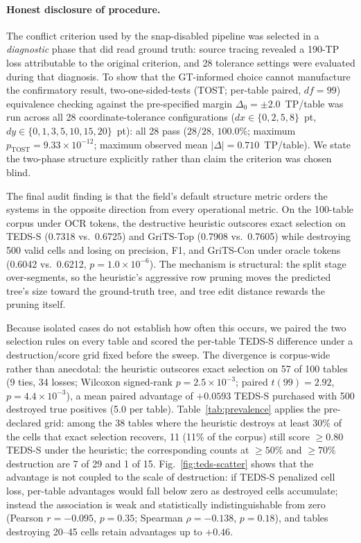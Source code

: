 \documentclass[final,5p,times,twocolumn]{elsarticle}
\begin{document}
\paragraph{Honest disclosure of procedure.} The conflict criterion used by the
snap-disabled pipeline was selected in a \emph{diagnostic} phase that did read
ground truth: source tracing revealed a 190-TP loss attributable to the
original criterion, and 28 tolerance settings were evaluated during that
diagnosis. To show that the GT-informed choice cannot manufacture the
confirmatory result, two-one-sided-tests (TOST; per-table paired, $df{=}99$)
equivalence checking against
the pre-specified margin $\Delta_0 = \pm 2.0$~TP/table was run across all 28
coordinate-tolerance configurations ($dx \in \{0, 2, 5, 8\}$~pt, $dy \in
\{0, 1, 3, 5, 10, 15, 20\}$~pt): all 28 pass ($28/28$, $100.0\%$; maximum
$p_{\mathrm{TOST}} = 9.33 \times 10^{-12}$; maximum observed mean
$|\Delta| = 0.710$~TP/table). We state the two-phase structure explicitly
rather than claim the criterion was chosen blind.

The final audit finding is that the field's default structure metric orders
the systems in the opposite direction from every operational metric. On the
100-table corpus under OCR tokens, the destructive heuristic outscores exact
selection on TEDS-S (0.7318 vs.\ 0.6725) and GriTS-Top (0.7908 vs.\ 0.7605)
while destroying 500 valid cells and losing on precision, F1, and
GriTS-Con under oracle tokens (0.6042 vs.\ 0.6212, $p=1.0\times 10^{-6}$).
The mechanism is structural: the split stage over-segments, so the heuristic's
aggressive row pruning moves the predicted tree's size toward the
ground-truth tree, and tree edit distance rewards the pruning itself.

Because isolated cases do not establish how often this occurs, we paired the
two selection rules on every table and scored the per-table TEDS-S
difference under a destruction/score grid fixed before the sweep. The divergence is
corpus-wide rather than anecdotal: the heuristic outscores exact selection
on 57 of 100 tables (9 ties, 34 losses; Wilcoxon signed-rank
$p = 2.5\times 10^{-3}$; paired $t(99) = 2.92$, $p = 4.4\times 10^{-3}$), a
mean paired advantage of $+0.0593$ TEDS-S purchased with 500 destroyed true
positives (5.0 per table). Table~\ref{tab:prevalence} applies the
pre-declared grid: among the 38 tables where the heuristic destroys at
least 30\% of the cells that exact selection recovers, 11 (11\% of the
corpus) still score $\geq 0.80$ TEDS-S under the heuristic; the
corresponding counts at $\geq 50\%$ and $\geq 70\%$ destruction are 7 of 29
and 1 of 15. Fig.~\ref{fig:teds-scatter} shows that the advantage is not
coupled to the scale of destruction: if TEDS-S penalized cell loss,
per-table advantages would fall below zero as destroyed cells accumulate;
instead the association is weak and statistically indistinguishable from
zero (Pearson $r = -0.095$, $p = 0.35$; Spearman $\rho = -0.138$,
$p = 0.18$), and tables destroying 20--45 cells retain advantages up to
$+0.46$.
\end{document}
